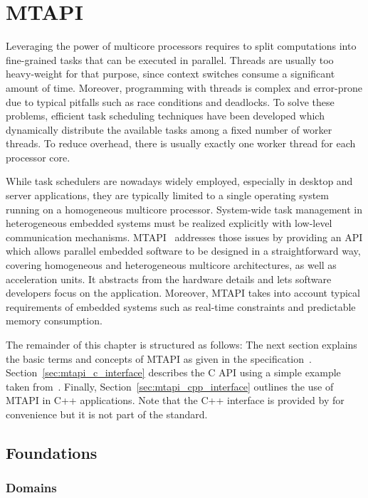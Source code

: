 \chapter{MTAPI}
\label{cha:mtapi}

Leveraging the power of multicore processors requires to split computations into fine-grained tasks that can be executed in parallel. Threads are usually too heavy-weight for that purpose, since context switches consume a significant amount of time. Moreover, programming with threads is complex and error-prone due to typical pitfalls such as race conditions and deadlocks. To solve these problems, efficient task scheduling techniques have been developed which dynamically distribute the available tasks among a fixed number of worker threads. To reduce overhead, there is usually exactly one worker thread for each processor core.

While task schedulers are nowadays widely employed, especially in desktop and server applications, they are typically limited to a single operating system running on a homogeneous multicore processor. System-wide task management in heterogeneous embedded systems must be realized explicitly with low-level communication mechanisms. MTAPI~\cite{MTAPI} addresses those issues by providing an API which allows parallel embedded software to be designed in a straightforward way, covering homogeneous and heterogeneous multicore architectures, as well as acceleration units. It abstracts from the hardware details and lets software developers focus on the application. Moreover, MTAPI takes into account typical requirements of embedded systems such as real-time constraints and predictable memory consumption.

The remainder of this chapter is structured as follows: The next section explains the basic terms and concepts of MTAPI as given in the specification~\cite{MTAPI}. Section~\ref{sec:mtapi_c_interface} describes the C API using a simple example taken from~\cite{MTAPI}. Finally, Section~\ref{sec:mtapi_cpp_interface} outlines the use of MTAPI in C++ applications. Note that the C++ interface is provided by \embb for convenience but it is not part of the standard.

\section{Foundations}

\subsection{Domains}

